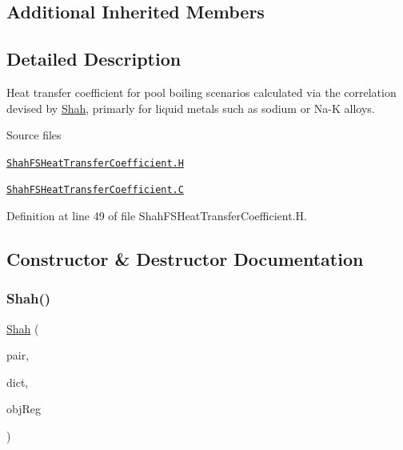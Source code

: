 \subsection*{Additional Inherited Members}


\subsection{Detailed Description}
Heat transfer coefficient for pool boiling scenarios calculated via the correlation devised by \hyperlink{classFoam_1_1FSHeatTransferCoefficientModels_1_1Shah}{Shah}, primarly for liquid metals such as sodium or Na-\/K alloys. 

\label{_Description}%
 \begin{DoxyParagraph}{Source files}

\begin{DoxyItemize}
\item \href{../../../home/carlo/data/GeN-Foam/GeN-Foam_ffn/GeN-Foam/GeN-Foam/classes/thermalHydraulics/src/physicsModels/heatTransferModels/FSHeatTransferCoefficientModels/Shah/ShahFSHeatTransferCoefficient.H}{\tt Shah\+F\+S\+Heat\+Transfer\+Coefficient.\+H} 
\item \href{../../../home/carlo/data/GeN-Foam/GeN-Foam_ffn/GeN-Foam/GeN-Foam/classes/thermalHydraulics/src/physicsModels/heatTransferModels/FSHeatTransferCoefficientModels/Shah/ShahFSHeatTransferCoefficient.C}{\tt Shah\+F\+S\+Heat\+Transfer\+Coefficient.\+C} 
\end{DoxyItemize}
\end{DoxyParagraph}


Definition at line 49 of file Shah\+F\+S\+Heat\+Transfer\+Coefficient.\+H.



\subsection{Constructor \& Destructor Documentation}
\mbox{\label{classFoam_1_1FSHeatTransferCoefficientModels_1_1Shah_aa749c9164589933b12f2f2e663e608b6}} 
\subsubsection{\texorpdfstring{Shah()}{Shah()}}
{\footnotesize\ttfamily \hyperlink{classFoam_1_1FSHeatTransferCoefficientModels_1_1Shah}{Shah} (\begin{DoxyParamCaption}\item[{const \hyperlink{classFoam_1_1FSPair}{F\+S\+Pair} \&}]{pair,  }\item[{const dictionary \&}]{dict,  }\item[{const object\+Registry \&}]{obj\+Reg }\end{DoxyParamCaption})}



